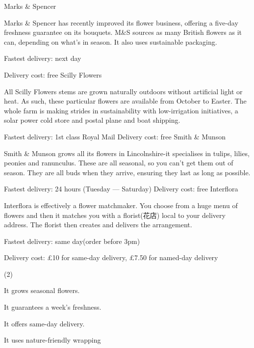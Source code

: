 \documentclass{英语试卷}
\begin{document}
\par Marks \& Spencer\par
\par Marks \& Spencer has recently improved its flower business, offering a five-day freshness guarantee on its bouquets. M\&S sources as many British flowers as it can, depending on what's in season. It also uses sustainable packaging.\par
\par Fastest delivery: next day\par
\par Delivery cost: free Scilly Flowers\par
\par All Scilly Flowers stems are grown naturally outdoors without artificial light or heat. As such, these particular flowers are available from October to Easter. The whole farm is making strides in sustainability with low-irrigation initiatives, a solar power cold store and postal plane and boat shipping.\par
\par Fastest delivery: 1st class Royal Mail Delivery cost: free Smith \& Munson\par
\par Smith \& Munson grows all its flowers in Lincolnshire-it specialises in tulips, lilies, peonies and ranunculus. These are all seasonal, so you can't get them out of season. They are all buds when they arrive, ensuring they last as long as possible.\par
\par Fastest delivery: 24 hours (Tuesday — Saturday) Delivery cost: free Interflora\par
\par Interflora is effectively a flower matchmaker. You choose from a huge menu of flowers and then it matches you with a florist(花店) local to your delivery address. The florist then creates and delivers the arrangement.\par
\par Fastest delivery: same day(order before 3pm)\par
\par Delivery cost: £10 for same-day delivery, £7.50 for named-day delivery\par
{}
\begin{choices}(2)
  \item It grows seasonal flowers.
  \item It guarantees a week's freshness.
  \item It offers same-day delivery.
  \item It uses nature-friendly wrapping
\end{choices}
\end{document}
